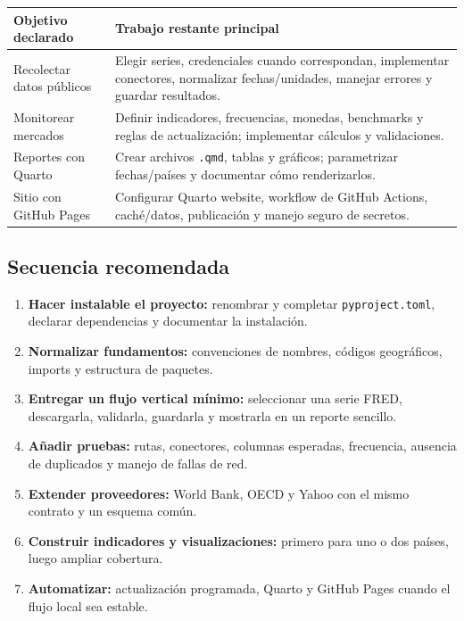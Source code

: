 \documentclass[11pt,a4paper]{article}
\newcommand{\code}[1]{\texttt{#1}}
\begin{document}
\begin{tabularx}{\textwidth}{@{}p{4.2cm}X@{}}
\toprule
\textbf{Objetivo declarado} & \textbf{Trabajo restante principal} \\
\midrule
Recolectar datos públicos & Elegir series, credenciales cuando correspondan, implementar conectores, normalizar fechas/unidades, manejar errores y guardar resultados. \\
Monitorear mercados & Definir indicadores, frecuencias, monedas, benchmarks y reglas de actualización; implementar cálculos y validaciones. \\
Reportes con Quarto & Crear archivos \code{.qmd}, tablas y gráficos; parametrizar fechas/países y documentar cómo renderizarlos. \\
Sitio con GitHub Pages & Configurar Quarto website, workflow de GitHub Actions, caché/datos, publicación y manejo seguro de secretos. \\
\bottomrule
\end{tabularx}

\subsection{Secuencia recomendada}

\begin{enumerate}
  \item \textbf{Hacer instalable el proyecto:} renombrar y completar \code{pyproject.toml}, declarar dependencias y documentar la instalación.
  \item \textbf{Normalizar fundamentos:} convenciones de nombres, códigos geográficos, imports y estructura de paquetes.
  \item \textbf{Entregar un flujo vertical mínimo:} seleccionar una serie FRED, descargarla, validarla, guardarla y mostrarla en un reporte sencillo.
  \item \textbf{Añadir pruebas:} rutas, conectores, columnas esperadas, frecuencia, ausencia de duplicados y manejo de fallas de red.
  \item \textbf{Extender proveedores:} World Bank, OECD y Yahoo con el mismo contrato y un esquema común.
  \item \textbf{Construir indicadores y visualizaciones:} primero para uno o dos países, luego ampliar cobertura.
  \item \textbf{Automatizar:} actualización programada, Quarto y GitHub Pages cuando el flujo local sea estable.
\end{enumerate}
\end{document}
